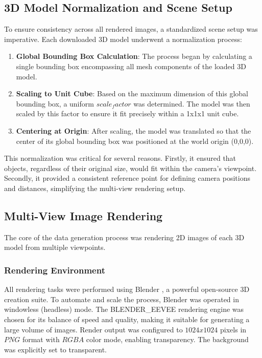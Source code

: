 \subsection{3D Model Normalization and Scene Setup}\label{ssec:model-normalization}
To ensure consistency across all rendered images, a standardized scene setup was imperative. Each downloaded 3D model underwent a normalization process:
\begin{enumerate}
  \item \textbf{Global Bounding Box Calculation}: The process began by calculating a single bounding box encompassing all mesh components of the loaded 3D model.
  \item \textbf{Scaling to Unit Cube}: Based on the maximum dimension of this global bounding box, a uniform $scale_factor$ was determined. The model was then scaled by this factor to ensure it fit precisely within a 1x1x1 unit cube.
  \item \textbf{Centering at Origin}: After scaling, the model was translated so that the center of its global bounding box was positioned at the world origin (0,0,0).
\end{enumerate}
This normalization was critical for several reasons. Firstly, it ensured that objects, regardless of their original size, would fit within the camera's viewpoint. Secondly, it provided a consistent reference point for defining camera positions and distances, simplifying the multi-view rendering setup.

\subsection{Multi-View Image Rendering}\label{ssec:multi-view-rendering}
The core of the data generation process was rendering 2D images of each 3D model from multiple viewpoints.

\subsubsection{Rendering Environment}\label{sssec:rendering-environment}
All rendering tasks were performed using Blender \cite{blender}, a powerful open-source 3D creation suite. To automate and scale the process, Blender was operated in windowless (headless) mode. The BLENDER\_EEVEE rendering engine was chosen for its balance of speed and quality, making it suitable for generating a large volume of images. Render output was configured to $1024x1024$ pixels in $PNG$ format with $RGBA$ color mode, enabling transparency. The background was explicitly set to transparent.


